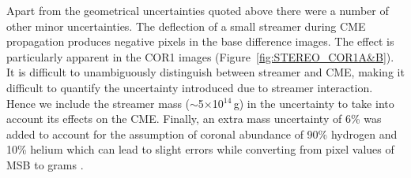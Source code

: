 
Apart from the geometrical uncertainties quoted above there were a number of other minor uncertainties. The deflection of a small streamer during CME propagation produces negative pixels in the base difference images. The effect is particularly apparent in the COR1 images (Figure~\ref{fig:STEREO_COR1A&B}). It is difficult to unambiguously distinguish between streamer and CME, making it difficult to quantify the uncertainty introduced due to streamer interaction. Hence we include the streamer mass ($\sim$5$\times$10$^{14}$\,g) in the uncertainty to take into account its effects on the CME. Finally, an extra mass uncertainty of 6\% was added to account for the assumption of coronal abundance of 90\% hydrogen and 10\% helium which can lead to slight errors while converting from pixel values of MSB to grams \citep{vour2010}. 



